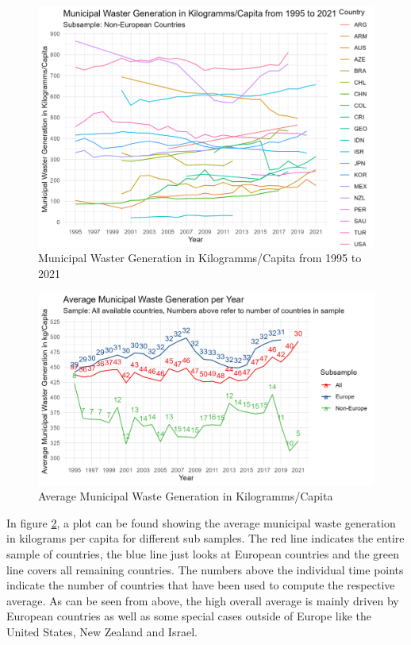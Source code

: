 \documentclass[12pt,a4paper]{article}
\begin{document}
\pagebreak
\begin{figure}[h]
\centering
\includegraphics[scale=0.8]{../04_figures/wastegeneration_NonEurope.png}
\caption{Municipal Waster Generation in Kilogramms/Capita from 1995 to 2021}
\label{fig:wastegen_NonEurope}
\end{figure}

\pagebreak
\begin{figure}[h]
\centering
\includegraphics[scale=0.8]{../04_figures/AvgGen_pc.png}
\caption{Average Municipal Waste Generation in Kilogramms/Capita}
\label{fig:AvgWasteGen}
\end{figure}
In figure \ref{fig:AvgWasteGen}, a plot can be found showing the average municipal waste generation in kilograms per capita for different sub samples. The red line indicates the entire sample of countries, the blue line just looks at European countries and the green line covers all remaining countries. The numbers above the individual time points indicate the number of countries that have been used to compute the respective average. As can be seen from above, the high overall average is mainly driven by European countries as well as some special cases outside of Europe like the United States, New Zealand and Israel. 
\pagebreak
\end{document}
